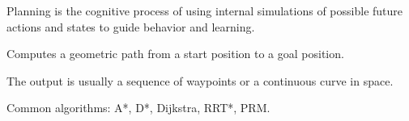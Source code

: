 \documentclass[a4paper]{article}
\title{}
\date{}
\begin{document}
   \maketitle

   \cite{mattar-2026-planning-in-the-brain-its-not-what-you-think-it-is}
   Planning is the cognitive process of using internal simulations of possible future actions and states to guide behavior and learning.

   Computes a geometric path from a start position to a goal position.

   The output is usually a sequence of waypoints or a continuous curve in space.

   Common algorithms: A*, D*, Dijkstra, RRT*, PRM.
\end{document}
